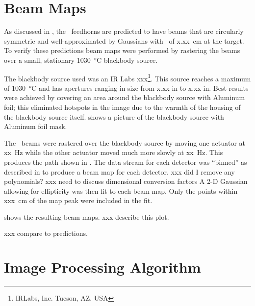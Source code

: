 \section{Beam Maps}

As discussed in , the \Imager\ feedhorns are predicted to have beams that are circularly symmetric and well-approximated by Gaussians with \FWHM\ of x.xx~cm at the target.
To verify these predictions beam maps were performed by rastering the beams over a small, stationary \SI{1030}{\celsius} blackbody source.

The blackbody source used was an IR Labs xxx\footnote{IRLabs, Inc. Tucson, AZ. USA}.
This source reaches a maximum of \SI{1030}{\celsius} and has apertures ranging in size from x.xx in to x.xx in.
Best results were achieved by covering an area around the blackbody source with Aluminum foil; this eliminated hotspots in the image due to the warmth of the housing of the blackbody source itself.
 shows a picture of the blackbody source with Aluminum foil mask.

The \Imager\ beams were rastered over the blackbody source by moving one actuator at xx~Hz while the other actuator moved much more slowly at xx~Hz.
This produces the path shown in .
The data stream for each detector was ``binned'' as described in  to produce a beam map for each detector.
xxx did I remove any polynomials?
xxx need to discuss dimensional conversion factors
A 2-D Gaussian allowing for ellipticity was then fit to each beam map.
Only the points within xxx~cm of the map peak were included in the fit.

 shows the resulting beam maps.
xxx describe this plot.

xxx compare to predictions.

\section{Image Processing Algorithm} \label{sec:ch8-algo}
